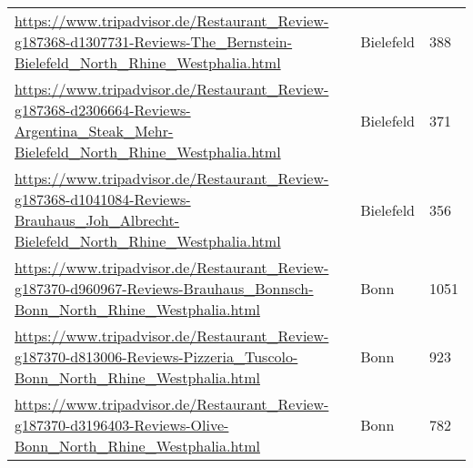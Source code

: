 \begin{table}[]
{\begin{tabular}{lll}
\url{https://www.tripadvisor.de/Restaurant\_Review-g187368-d1307731-Reviews-The\_Bernstein-Bielefeld\_North\_Rhine\_Westphalia.html} & Bielefeld & 388 \\ 
\url{https://www.tripadvisor.de/Restaurant\_Review-g187368-d2306664-Reviews-Argentina\_Steak\_Mehr-Bielefeld\_North\_Rhine\_Westphalia.html} & Bielefeld & 371 \\ 
\url{https://www.tripadvisor.de/Restaurant\_Review-g187368-d1041084-Reviews-Brauhaus\_Joh\_Albrecht-Bielefeld\_North\_Rhine\_Westphalia.html} & Bielefeld & 356 \\ 
\url{https://www.tripadvisor.de/Restaurant\_Review-g187370-d960967-Reviews-Brauhaus\_Bonnsch-Bonn\_North\_Rhine\_Westphalia.html} & Bonn & 1051 \\ 
\url{https://www.tripadvisor.de/Restaurant\_Review-g187370-d813006-Reviews-Pizzeria\_Tuscolo-Bonn\_North\_Rhine\_Westphalia.html} & Bonn & 923 \\ 
\url{https://www.tripadvisor.de/Restaurant\_Review-g187370-d3196403-Reviews-Olive-Bonn\_North\_Rhine\_Westphalia.html} & Bonn & 782 \\ 
\hline
\end{tabular}
}
\end{table}